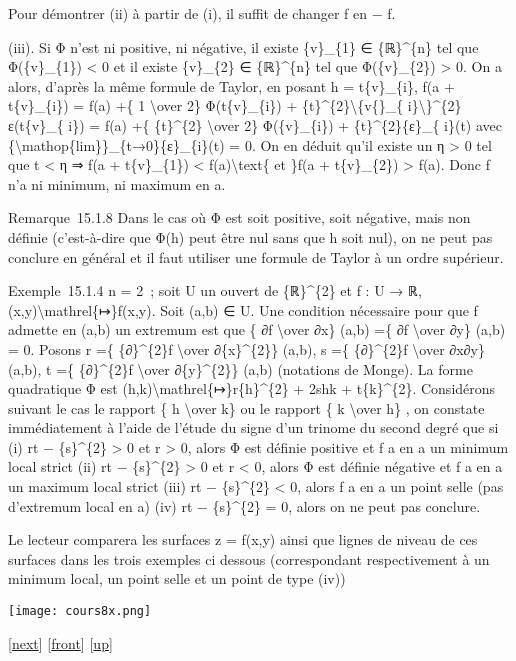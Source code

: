 Pour démontrer (ii) à partir de (i), il suffit de changer f en − f.

(iii). Si Φ n'est ni positive, ni négative, il existe \{v\}\_\{1\} ∈
\{ℝ\}\^{}\{n\} tel que Φ(\{v\}\_\{1\}) \textless{} 0 et il existe
\{v\}\_\{2\} ∈ \{ℝ\}\^{}\{n\} tel que Φ(\{v\}\_\{2\}) \textgreater{} 0.
On a alors, d'après la même formule de Taylor, en posant h =
t\{v\}\_\{i\}, f(a + t\{v\}\_\{i\}) = f(a) +\{ 1 \textbackslash{}over
2\} Φ(t\{v\}\_\{i\}) +
\{t\}\^{}\{2\}\textbackslash{}\textbar{}\{v\{\}\_\{
i\}\textbackslash{}\textbar{}\}\^{}\{2\}ε(t\{v\}\_\{ i\}) = f(a) +\{
\{t\}\^{}\{2\} \textbackslash{}over 2\} Φ(\{v\}\_\{i\}) +
\{t\}\^{}\{2\}\{ε\}\_\{ i\}(t) avec
\{\textbackslash{}mathop\{lim\}\}\_\{t→0\}\{ε\}\_\{i\}(t) = 0. On en
déduit qu'il existe un η \textgreater{} 0 tel que \textbar{}t\textbar{}
\textless{} η ⇒ f(a + t\{v\}\_\{1\}) \textless{}
f(a)\textbackslash{}text\{ et \}f(a + t\{v\}\_\{2\}) \textgreater{}
f(a). Donc f n'a ni minimum, ni maximum en a.

Remarque~15.1.8 Dans le cas où Φ est soit positive, soit négative, mais
non définie (c'est-à-dire que Φ(h) peut être nul sans que h soit nul),
on ne peut pas conclure en général et il faut utiliser une formule de
Taylor à un ordre supérieur.

Exemple~15.1.4 n = 2~; soit U un ouvert de \{ℝ\}\^{}\{2\} et f : U → ℝ,
(x,y)\textbackslash{}mathrel\{↦\}f(x,y). Soit (a,b) ∈ U. Une condition
nécessaire pour que f admette en (a,b) un extremum est que \{ ∂f
\textbackslash{}over ∂x\} (a,b) =\{ ∂f \textbackslash{}over ∂y\} (a,b) =
0. Posons r =\{ \{∂\}\^{}\{2\}f \textbackslash{}over ∂\{x\}\^{}\{2\}\}
(a,b), s =\{ \{∂\}\^{}\{2\}f \textbackslash{}over ∂x∂y\} (a,b), t =\{
\{∂\}\^{}\{2\}f \textbackslash{}over ∂\{y\}\^{}\{2\}\} (a,b) (notations
de Monge). La forme quadratique Φ est
(h,k)\textbackslash{}mathrel\{↦\}r\{h\}\^{}\{2\} + 2shk +
t\{k\}\^{}\{2\}. Considérons suivant le cas le rapport \{ h
\textbackslash{}over k\} ou le rapport \{ k \textbackslash{}over h\} ,
on constate immédiatement à l'aide de l'étude du signe d'un trinome du
second degré que si (i) rt − \{s\}\^{}\{2\} \textgreater{} 0 et r
\textgreater{} 0, alors Φ est définie positive et f a en a un minimum
local strict (ii) rt − \{s\}\^{}\{2\} \textgreater{} 0 et r \textless{}
0, alors Φ est définie négative et f a en a un maximum local strict
(iii) rt − \{s\}\^{}\{2\} \textless{} 0, alors f a en a un point selle
(pas d'extremum local en a) (iv) rt − \{s\}\^{}\{2\} = 0, alors on ne
peut pas conclure.

Le lecteur comparera les surfaces z = f(x,y) ainsi que lignes de niveau
de ces surfaces dans les trois exemples ci dessous (correspondant
respectivement à un minimum local, un point selle et un point de type
(iv))

\texttt{[image: cours8x.png]}

{[}\href{coursse83.html}{next}{]} {[}\href{coursse82.html}{front}{]}
{[}\href{coursch16.html\#coursse82.html}{up}{]}
